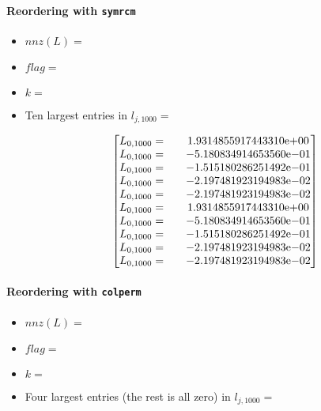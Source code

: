 \begin{enumerate}
\paragraph*{Reordering with \texttt{symrcm}}
\begin{itemize}
\item $nnz(L)= $
\item $flag= $
\item $k= $
\item Ten largest entries in $l_{j,1000}= $

$$
\begin{bmatrix}
L_{0,1000}=  & \quad {1.9314855917443310}\mathrm{e}{+00}\\
L_{0,1000}=  & \quad {-5.180834914653560}\mathrm{e}{-01}\\
L_{0,1000}=  & \quad {-1.515180286251492}\mathrm{e}{-01}\\
L_{0,1000}=  & \quad {-2.197481923194983}\mathrm{e}{-02}\\
L_{0,1000}=  & \quad {-2.197481923194983}\mathrm{e}{-02}\\
L_{0,1000}=  & \quad {1.9314855917443310}\mathrm{e}{+00}\\
L_{0,1000}=  & \quad {-5.180834914653560}\mathrm{e}{-01}\\
L_{0,1000}=  & \quad {-1.515180286251492}\mathrm{e}{-01}\\
L_{0,1000}=  & \quad {-2.197481923194983}\mathrm{e}{-02}\\
L_{0,1000}=  & \quad {-2.197481923194983}\mathrm{e}{-02}\\
\end{bmatrix}
$$
\end{itemize}
\newpage
\paragraph*{Reordering with \texttt{colperm}}
\begin{itemize}
\item $nnz(L)= $
\item $flag= $
\item $k= $
\item Four largest entries (the rest is all zero) in $l_{j,1000}= $ 


\end{itemize}
\end{enumerate}

